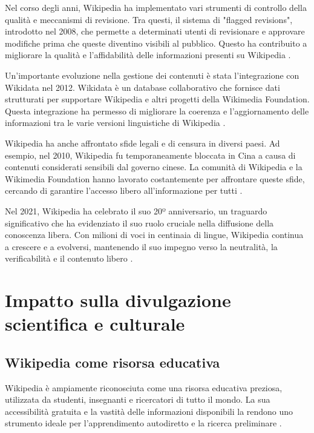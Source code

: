 \documentclass[12pt,a4paper]{report}
\begin{document}
Nel corso degli anni, Wikipedia ha implementato vari strumenti di controllo della qualità e meccanismi di revisione. Tra questi, il sistema di "flagged revisions", introdotto nel 2008, che permette a determinati utenti di revisionare e approvare modifiche prima che queste diventino visibili al pubblico. Questo ha contribuito a migliorare la qualità e l'affidabilità delle informazioni presenti su Wikipedia \cite{denning2005wikipedia}.

Un'importante evoluzione nella gestione dei contenuti è stata l'integrazione con Wikidata nel 2012. Wikidata è un database collaborativo che fornisce dati strutturati per supportare Wikipedia e altri progetti della Wikimedia Foundation. Questa integrazione ha permesso di migliorare la coerenza e l'aggiornamento delle informazioni tra le varie versioni linguistiche di Wikipedia \cite{history_of_wikis}.

Wikipedia ha anche affrontato sfide legali e di censura in diversi paesi. Ad esempio, nel 2010, Wikipedia fu temporaneamente bloccata in Cina a causa di contenuti considerati sensibili dal governo cinese. La comunità di Wikipedia e la Wikimedia Foundation hanno lavorato costantemente per affrontare queste sfide, cercando di garantire l'accesso libero all'informazione per tutti \cite{jemielniak2014wikipedia}.

Nel 2021, Wikipedia ha celebrato il suo 20º anniversario, un traguardo significativo che ha evidenziato il suo ruolo cruciale nella diffusione della conoscenza libera. Con milioni di voci in centinaia di lingue, Wikipedia continua a crescere e a evolversi, mantenendo il suo impegno verso la neutralità, la verificabilità e il contenuto libero \cite{reagle2010good}.

\section{Impatto sulla divulgazione scientifica e culturale}

\subsection{Wikipedia come risorsa educativa}

Wikipedia è ampiamente riconosciuta come una risorsa educativa preziosa, utilizzata da studenti, insegnanti e ricercatori di tutto il mondo. La sua accessibilità gratuita e la vastità delle informazioni disponibili la rendono uno strumento ideale per l'apprendimento autodiretto e la ricerca preliminare \cite{reagle2010good}.
\end{document}
